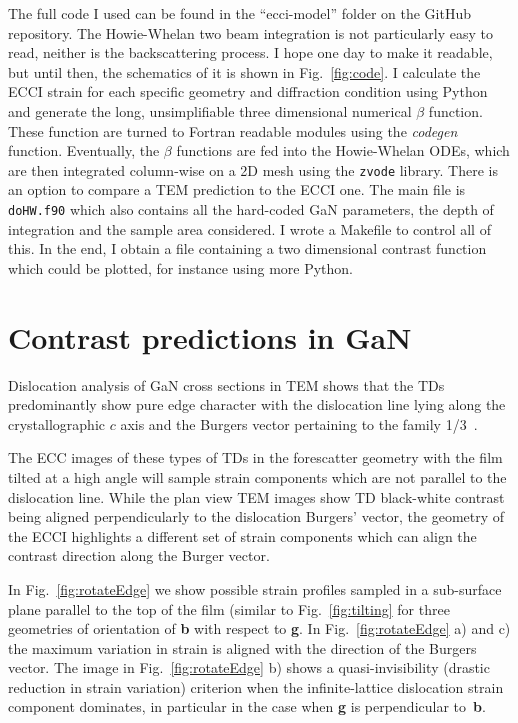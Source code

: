The full code I used can be found in  the ``ecci-model'' folder on the GitHub repository. The Howie-Whelan two beam integration is not particularly easy  to read, neither is the backscattering process. I hope one day to make it readable, but until then, the schematics of it is shown in Fig.~\ref{fig:code}. I calculate the ECCI strain for each specific geometry and diffraction condition using Python and generate the long, unsimplifiable three dimensional numerical $\beta$ function. These function are turned to Fortran readable modules using the \textit{codegen} function. Eventually, the $\beta$ functions are fed into the Howie-Whelan ODEs, which are then integrated column-wise on a 2D mesh using the \texttt{zvode} library. There is an option to compare a TEM prediction to the ECCI one.   The main file is \texttt{doHW.f90} which also contains all the hard-coded GaN parameters, the depth of integration and the sample area considered. I wrote a Makefile to control all of this. In the end, I obtain a file containing a two dimensional contrast function which could be plotted, for instance using more Python. 



\section{Contrast predictions in GaN}
\label{sec:contrastGaN}
Dislocation analysis of GaN cross sections in TEM shows that the TDs predominantly show pure edge character with the dislocation line lying along the crystallographic $c$ axis and the Burgers vector pertaining to the family  1/3~\cite{Hino00}.

The ECC images of these types of TDs in the forescatter geometry with the film tilted at a high angle will sample strain components which are not parallel to the dislocation line. While the plan view TEM images show TD black-white contrast being aligned perpendicularly to the dislocation Burgers' vector, the geometry of the ECCI highlights a different set of strain components which can align the contrast direction along the Burger vector.

In Fig.~\ref{fig:rotateEdge} we show possible strain profiles sampled in a sub-surface plane parallel to the top of the film (similar to Fig.~\ref{fig:tilting} for three geometries of orientation of \textbf{b} with respect to \textbf{g}. In Fig.~\ref{fig:rotateEdge} a) and c) the maximum variation in strain is aligned with the direction of the Burgers vector. The image in Fig.~\ref{fig:rotateEdge} b) shows a quasi-invisibility (drastic reduction in strain variation) criterion when the infinite-lattice dislocation strain component dominates, in particular in the case when \textbf{g} is perpendicular to~\textbf{b}.

